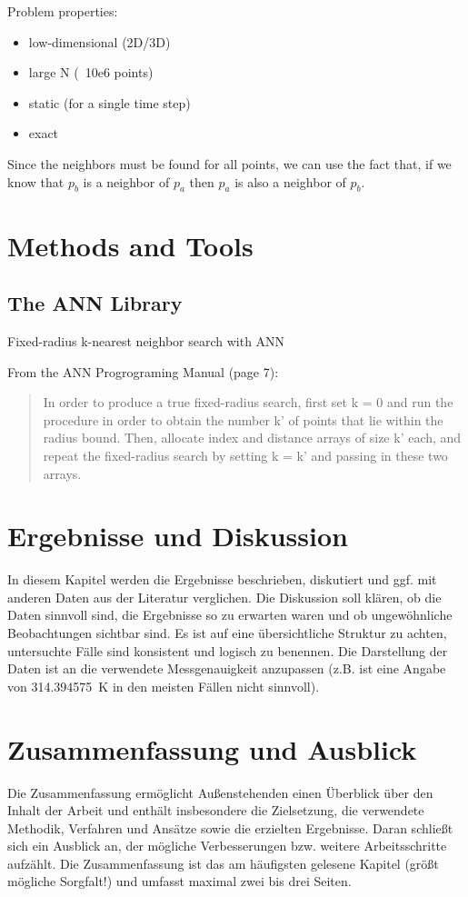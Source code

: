 Problem properties:

\begin{itemize}
\item low-dimensional (2D/3D)
\item large N (~10e6 points)
\item static (for a single time step)
\item  exact
\end{itemize}

Since the neighbors must be found for all points, we can use the fact that, if we know that $p_b$ is a neighbor of $p_a$ then $p_a$ is also a neighbor of $p_b$.   

\chapter{Methods and Tools}


\section{The ANN Library}


Fixed-radius k-nearest neighbor search with ANN

From the ANN Progrograming Manual (page 7):
\begin{quote}
  In order to produce a true fixed-radius search,  first set k = 0 and run the procedure in order to obtain the number k' of points that lie within the radius bound. Then, allocate index and distance arrays of size k' each, and repeat the fixed-radius search by setting k = k' and passing in these two arrays.
\end{quote}


\chapter{Ergebnisse und Diskussion}

In diesem Kapitel werden die Ergebnisse beschrieben, diskutiert und ggf. mit anderen Daten aus der Literatur verglichen. Die Diskussion soll klären, ob die Daten sinnvoll sind, die Ergebnisse so zu erwarten waren und ob ungewöhnliche Beobachtungen sichtbar sind. Es ist auf eine übersichtliche Struktur zu achten, untersuchte Fälle sind konsistent und logisch zu benennen. Die Darstellung der Daten ist an die verwendete Messgenauigkeit anzupassen (z.B. ist eine Angabe von \SI{314.394575}{K} in den meisten Fällen nicht sinnvoll).

\chapter{Zusammenfassung und Ausblick}

Die Zusammenfassung ermöglicht Außenstehenden einen Überblick über den Inhalt der Arbeit und enthält insbesondere die Zielsetzung, die verwendete Methodik, Verfahren und Ansätze sowie die erzielten Ergebnisse. Daran schließt sich ein Ausblick an, der mögliche Verbesserungen bzw. weitere Arbeitsschritte aufzählt. Die Zusammenfassung ist das am häufigsten gelesene Kapitel (größt mögliche Sorgfalt!) und umfasst maximal zwei bis drei Seiten.

